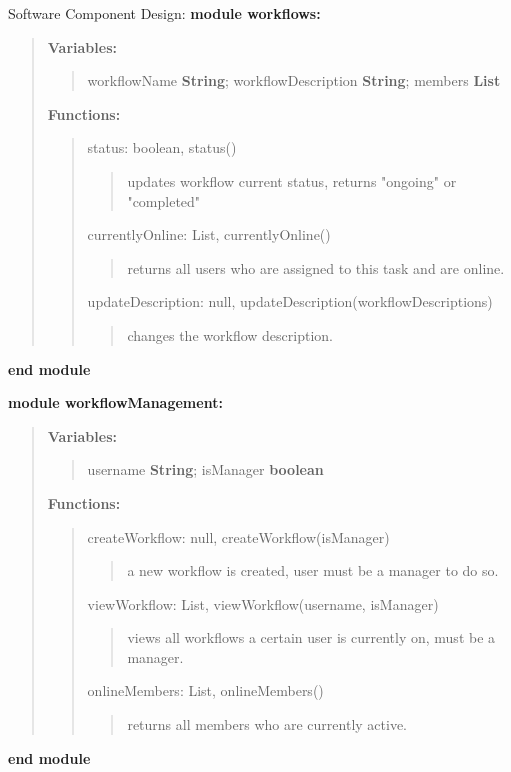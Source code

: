 \documentclass{article}[draft]
\begin{document}
\noindent Software Component Design:
\bigbreak
\noindent \textbf{module workflows:}
\begin{quote}
  \textbf{Variables:}
  \begin{quote}
    workflowName \textbf{String}; workflowDescription \textbf{String}; members \textbf{List}
  \end{quote}
  \textbf{Functions:}
  \begin{quote}

    status: boolean, status()
    \begin{quote}
      updates workflow current status, returns "ongoing" or "completed"
    \end{quote}

    currentlyOnline: List, currentlyOnline()
    \begin{quote}
      returns all users who are assigned to this task and are online.
    \end{quote}

    updateDescription: null, updateDescription(workflowDescriptions)
    \begin{quote}
     changes the workflow description.
    \end{quote}
  \end{quote}
\end{quote}
\textbf{end module}
\bigbreak

\noindent \textbf{module workflowManagement:}
\begin{quote}
  \textbf{Variables:}
  \begin{quote}
    username \textbf{String}; isManager \textbf{boolean}
  \end{quote}

  \textbf{Functions:}
  \begin{quote}

    createWorkflow: null, createWorkflow(isManager)
    \begin{quote}
      a new workflow is created, user must be a manager to do so.
    \end{quote}

    viewWorkflow: List, viewWorkflow(username, isManager)
    \begin{quote}
      views all workflows a certain user is currently on, must be a manager.
    \end{quote}

    onlineMembers: List, onlineMembers()
    \begin{quote}
      returns all members who are currently active.
    \end{quote}

  \end{quote}
\end{quote}
\textbf{end module}
\bigbreak
\end{document}

